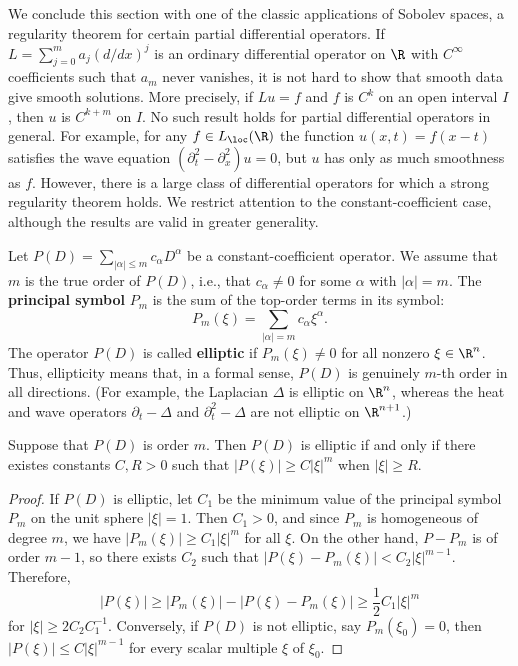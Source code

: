 We conclude this section with one of the classic applications of Sobolev spaces, a regularity theorem for certain partial differential operators. If $L=\sum_{j=0}^{m}a_j(d/dx)^j$ is an ordinary differential operator on $\R$ with $C^\infty$ coefficients such that $a_m$ never vanishes, it is not hard to show that smooth data give smooth solutions. More precisely, if $Lu=f$ and $f$ is $C^k$ on an open interval $I$, then $u$ is $C^{k+m}$ on $I$. No such result holds for partial differential operators in general. For example, for any $f\in L_{\loc}(\R)$ the function $u(x,t)=f(x-t)$ satisfies the wave equation $(\partial_t^2-\partial_x^2)u=0$, but $u$ has only as much smoothness as $f$. However, there is a large class of differential operators for which a strong regularity theorem holds. We restrict attention to the constant-coefficient case, although the results are valid in greater generality.\par
Let $P(D)=\sum_{|\alpha|\leq m}c_\alpha D^\alpha$ be a constant-coefficient operator. We assume that $m$ is the true order of $P(D)$, i.e., that $c_\alpha\neq 0$ for some $\alpha$ with $|\alpha|=m$. The \textbf{principal symbol} $P_m$ is the sum of the top-order terms in its symbol:
\[P_m(\xi)=\sum_{|\alpha|=m}c_\alpha\xi^\alpha.\]
The operator $P(D)$ is called \textbf{elliptic} if $P_m(\xi)\neq 0$ for all nonzero $\xi\in\R^n$. Thus, ellipticity means that, in a formal sense, $P(D)$ is genuinely $m$-th order in all directions. (For example, the Laplacian $\Delta$ is elliptic on $\R^n$, whereas the heat and wave operators $\partial_t-\Delta$ and $\partial_t^2-\Delta$ are not elliptic on $\R^{n+1}$.)
\begin{lemma}\label{operator elliptic iff polynomial order}
Suppose that $P(D)$ is order $m$. Then $P(D)$ is elliptic if and only if there existes constants $C,R>0$ such that $|P(\xi)|\geq C|\xi|^m$ when $|\xi|\geq R$.
\end{lemma}
\begin{proof}
If $P(D)$ is elliptic, let $C_1$ be the minimum value of the principal symbol $P_m$ on the unit sphere $|\xi|=1$. Then $C_1>0$, and since $P_m$ is homogeneous of degree $m$, we have $|P_m(\xi)|\geq C_1|\xi|^m$ for all $\xi$. On the other hand, $P-P_m$ is of order $m-1$, so there exists $C_2$ such that $|P(\xi)-P_m(\xi)|<C_2|\xi|^{m-1}$. Therefore,
\[|P(\xi)|\geq|P_m(\xi)|-|P(\xi)-P_m(\xi)|\geq\frac{1}{2}C_1|\xi|^m\]
for $|\xi|\geq 2C_2C_1^{-1}$. Conversely, if $P(D)$ is not elliptic, say $P_m(\xi_0)=0$, then $|P(\xi)|\leq C|\xi|^{m-1}$ for every scalar multiple $\xi$ of $\xi_0$.
\end{proof}
